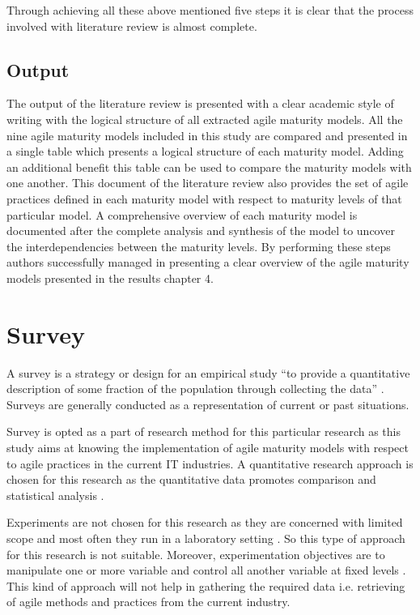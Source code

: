 \documentclass[a4paper,oneside]{bth}
\begin{document}
Through achieving all these above mentioned five steps it is clear that the process involved with literature review is almost complete.
\subsection{Output}
The output of the literature review is presented with a clear academic style of writing with the logical structure of all extracted agile maturity models. All the nine agile maturity models included in this study are compared and presented in a single table which presents a logical structure of each maturity model. Adding an additional benefit this table can be used to compare the maturity models with one another. This document of the literature review also provides the set of agile practices defined in each maturity model with respect to maturity levels of that particular model. A comprehensive overview of each maturity model is documented after the complete analysis and synthesis of the model to uncover the interdependencies between the maturity levels. By performing these steps authors successfully managed in presenting a clear overview of the agile maturity models presented in the results chapter 4.
\section{Survey}
A survey is a strategy or design for an empirical study “to provide a quantitative description of some fraction of the population through collecting the data” \cite{punter_conducting_2003}. Surveys are generally conducted as a representation of current or past situations.

Survey is opted as a part of research method for this particular research as this study aims at knowing the implementation of agile maturity models with respect to agile practices in the current IT industries. A quantitative research approach is chosen for this research as the quantitative data promotes comparison and statistical analysis \cite{wohlin_empirical_2003}.

Experiments are not chosen for this research as they are concerned with limited scope and most often they run in a laboratory setting \cite{wohlin_empirical_2003}. So this type of approach for this research is not suitable. Moreover, experimentation objectives are to manipulate one or more variable and control all another variable at fixed levels \cite{wohlin_empirical_2003}. This kind of approach will not help in gathering the required data i.e. retrieving of agile methods and practices from the current industry. 
\end{document}
